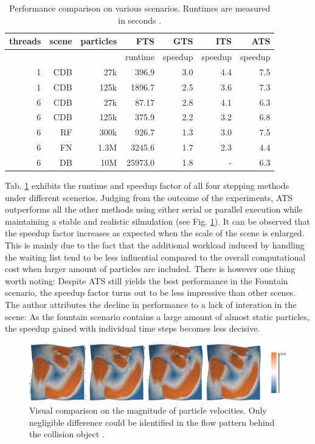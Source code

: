 \documentclass[
	11pt, 
	DIV10,
	ngerman,
	a4paper, 
	oneside, 
	headings=normal, 
	captions=tableheading,
	final, 
	numbers=noenddot
]{scrartcl}
\begin{document}
\begin{table}[tb]
	\centering
	\begin{tabular}{|r|r|r|r|r|r|r|}
		\hline
		threads & scene & particles & FTS & GTS & ITS & ATS \\
		\hline
		& & & runtime & speedup & speedup & speedup \\
		\hline	
		1 & CDB & 27k & 396.9 & 3.0 & 4.4 & 7.5 \\
		1 & CDB & 125k & 1896.7 & 2.5 & 3.6 & 7.3 \\
		6 & CDB & 27k & 87.17 & 2.8 & 4.1 & 6.3 \\
		6 & CDB & 125k & 375.9 & 2.2 & 3.2 & 6.8 \\
		6 & RF & 300k & 926.7 & 1.3 & 3.0 & 7.5 \\
		6 & FN & 1.3M & 3245.6 & 1.7 & 2.3 & 4.4 \\
		6 & DB & 10M & 25973.0 & 1.8 & - & 6.3 \\
		\hline
	\end{tabular}
	\caption{\label{tab1} Performance comparison on various scenarios. Runtimes are measured in seconds \cite{reinhardt2017fully}.}
\end{table}

Tab. \ref{tab1} exhibits the runtime and speedup factor of all four stepping methods under different scenerios. Judging from the outcome of the experiments, ATS outperforms all the other methods using either serial or parallel execution while maintaining a stable and realistic silmulation (see Fig. \ref{fig7}). It can be observed that the speedup factor increases as expected when the scale of the scene is enlarged. This is mainly due to the fact that the additional workload induced by handling the waiting list tend to be less influential compared to the overall computational cost when larger amount of particles are included. There is however one thing worth noting: Despite ATS still yields the best performance in the Fountain scenario, the speedup factor turns out to be less impressive than other scenes. The author attributes the decline in performance to a lack of interation in the scene: As the fountain scenario contains a large amount of almost static particles, the speedup gained with individual time steps becomes less decisive.

\begin{figure}[tb]
	\centering
	\includegraphics[scale=0.26]{images/2}
	\caption{\label{fig7} Visual comparison on the magnitude of particle velocities. Only negligible difference could be identified in the flow pattern behind the collision object \cite{reinhardt2017fully}.}
\end{figure}
\end{document}
